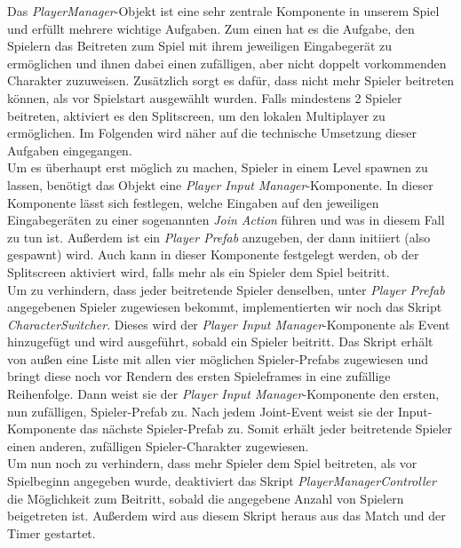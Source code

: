 Das \textit{PlayerManager}-Objekt ist eine sehr zentrale Komponente in unserem Spiel und erfüllt mehrere wichtige Aufgaben. Zum einen hat es die Aufgabe, den Spielern das Beitreten zum Spiel mit ihrem jeweiligen Eingabegerät zu ermöglichen und ihnen dabei einen zufälligen, aber nicht doppelt vorkommenden
Charakter zuzuweisen. Zusätzlich sorgt es dafür, dass nicht mehr Spieler beitreten können, als vor Spielstart ausgewählt wurden. Falls mindestens 2 Spieler beitreten, aktiviert es den Splitscreen, um den lokalen Multiplayer zu ermöglichen. Im Folgenden wird näher auf die technische Umsetzung dieser Aufgaben eingegangen.\\

Um es überhaupt erst möglich zu machen, Spieler in einem Level spawnen zu lassen, benötigt das Objekt eine \textit{Player Input Manager}-Komponente. In dieser Komponente lässt sich festlegen, welche Eingaben auf den jeweiligen Eingabegeräten zu einer sogenannten \textit{Join Action} führen und was in diesem Fall zu tun ist. Außerdem ist ein \textit{Player Prefab} anzugeben, der dann initiiert (also gespawnt) wird. Auch kann in dieser Komponente festgelegt werden, ob der Splitscreen aktiviert wird, falls mehr als ein Spieler dem Spiel beitritt.\\

Um zu verhindern, dass jeder beitretende Spieler denselben, unter \textit{Player Prefab} angegebenen Spieler zugewiesen bekommt, implementierten wir noch das Skript \textit{CharacterSwitcher}. Dieses wird der \textit{Player Input Manager}-Komponente als Event hinzugefügt und wird ausgeführt, sobald ein Spieler beitritt. Das Skript erhält von außen eine Liste mit allen vier möglichen Spieler-Prefabs zugewiesen und bringt diese noch vor Rendern des ersten Spieleframes in eine zufällige Reihenfolge. Dann weist sie der \textit{Player Input Manager}-Komponente den ersten, nun zufälligen, Spieler-Prefab zu. Nach jedem Joint-Event weist sie der Input-Komponente das nächste Spieler-Prefab zu. Somit erhält jeder beitretende Spieler einen anderen, zufälligen Spieler-Charakter zugewiesen.\\

Um nun noch zu verhindern, dass mehr Spieler dem Spiel beitreten, als vor Spielbeginn angegeben wurde, deaktiviert das Skript \textit{PlayerManagerController} die Möglichkeit zum Beitritt, sobald die angegebene Anzahl von Spielern beigetreten ist. Außerdem wird aus diesem Skript heraus aus das Match und der Timer gestartet.\\

